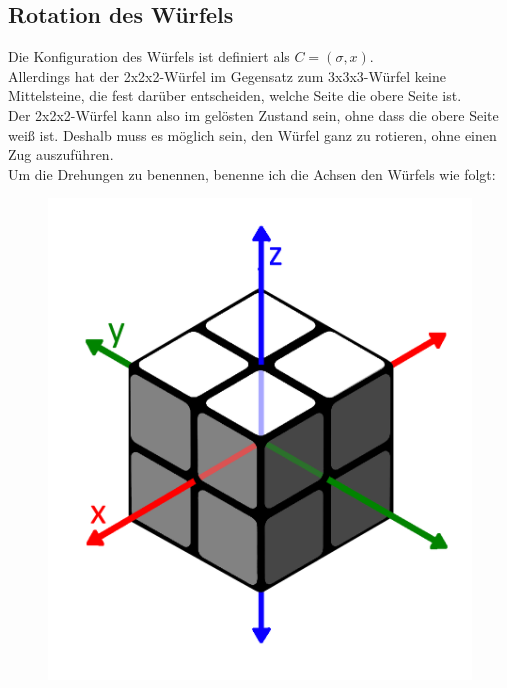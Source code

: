 \documentclass[12pt,a4paper, usenames, dvipsnames]{article}
\begin{document}








\subsection*{Rotation des Würfels}

Die Konfiguration des Würfels ist definiert als $C=(\sigma, x)$. \\
Allerdings hat der 2x2x2-Würfel im Gegensatz zum 3x3x3-Würfel keine Mittelsteine, die fest darüber entscheiden, welche Seite die obere Seite ist. \\
Der 2x2x2-Würfel kann also im gelösten Zustand sein, ohne dass die obere Seite weiß ist. Deshalb muss es möglich sein, den Würfel ganz zu rotieren, ohne einen Zug auszuführen. \\
Um die Drehungen zu benennen, benenne ich die Achsen den Würfels wie folgt:
\begin{figure}[H]
\centering
\includegraphics[scale=0.13]{Pfeile.png}
\end{figure} 
\end{document}
